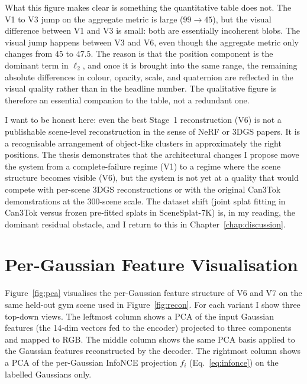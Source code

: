What this figure makes clear is something the quantitative table does not. The V1 to V3 jump on the aggregate metric is large ($99 \to 45$), but the visual difference between V1 and V3 is small: both are essentially incoherent blobs. The visual jump happens between V3 and V6, even though the aggregate metric only changes from $45$ to $47.5$. The reason is that the position component is the dominant term in $\ell_2$, and once it is brought into the same range, the remaining absolute differences in colour, opacity, scale, and quaternion are reflected in the visual quality rather than in the headline number. The qualitative figure is therefore an essential companion to the table, not a redundant one.

I want to be honest here: even the best Stage~1 reconstruction (V6) is not a publishable scene-level reconstruction in the sense of NeRF or 3DGS papers. It is a recognisable arrangement of object-like clusters in approximately the right positions. The thesis demonstrates that the architectural changes I propose move the system from a complete-failure regime (V1) to a regime where the scene structure becomes visible (V6), but the system is not yet at a quality that would compete with per-scene 3DGS reconstructions or with the original Can3Tok demonstrations at the 300-scene scale. The dataset shift (joint splat fitting in Can3Tok versus frozen pre-fitted splats in SceneSplat-7K) is, in my reading, the dominant residual obstacle, and I return to this in Chapter~\ref{chap:discussion}.

\section{Per-Gaussian Feature Visualisation}
\label{sec:results_pca}

Figure~\ref{fig:pca} visualises the per-Gaussian feature structure of V6 and V7 on the same held-out gym scene used in Figure~\ref{fig:recon}. For each variant I show three top-down views. The leftmost column shows a PCA of the input Gaussian features (the 14-dim vectors fed to the encoder) projected to three components and mapped to RGB. The middle column shows the same PCA basis applied to the Gaussian features reconstructed by the decoder. The rightmost column shows a PCA of the per-Gaussian InfoNCE projection $f_i$ (Eq.~\eqref{eq:infonce}) on the labelled Gaussians only.

